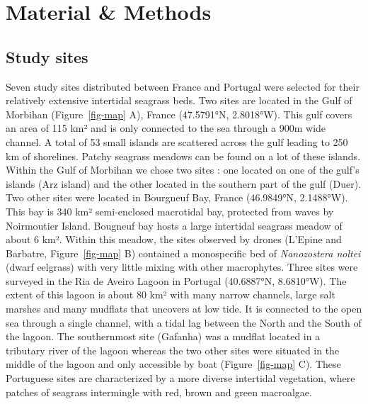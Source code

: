 \documentclass[
  number]{elsarticle}
\begin{document}
\section{Material \& Methods}\label{material-methods}

\subsection{Study sites}\label{study-sites}

Seven study sites distributed between France and Portugal were selected
for their relatively extensive intertidal seagrass beds. Two sites are
located in the Gulf of Morbihan (Figure~\ref{fig-map} A), France
(47.5791°N, 2.8018°W). This gulf covers an area of 115 km² and is only
connected to the sea through a 900m wide channel. A total of 53 small
islands are scattered across the gulf leading to 250 km of shorelines.
Patchy seagrass meadows can be found on a lot of these islands. Within
the Gulf of Morbihan we chose two sites : one located on one of the
gulf's islands (Arz island) and the other located in the southern part
of the gulf (Duer). Two other sites were located in Bourgneuf Bay,
France (46.9849°N, 2.1488°W). This bay is 340 km² semi-enclosed
macrotidal bay, protected from waves by Noirmoutier Island. Bougneuf bay
hosts a large intertidal seagrass meadow of about 6 km². Within this
meadow, the sites observed by drones (L'Epine and Barbatre,
Figure~\ref{fig-map} B) contained a monospecific bed of
\emph{Nanozostera noltei} (dwarf eelgrass) with very little mixing with
other macrophytes. Three sites were surveyed in the Ria de Aveiro Lagoon
in Portugal (40.6887°N, 8.6810°W). The extent of this lagoon is about 80
km² with many narrow channels, large salt marshes and many mudflats that
uncovers at low tide. It is connected to the open sea through a single
channel, with a tidal lag between the North and the South of the lagoon.
The southernmost site (Gafanha) was a mudflat located in a tributary
river of the lagoon whereas the two other sites were situated in the
middle of the lagoon and only accessible by boat (Figure~\ref{fig-map}
C). These Portuguese sites are characterized by a more diverse
intertidal vegetation, where patches of seagrass intermingle with red,
brown and green macroalgae.
\end{document}
